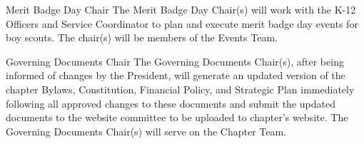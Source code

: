 \begin{enumsubsection}



\item{Merit Badge Day Chair} The Merit Badge Day Chair(s) will work with the K-12 Officers and Service Coordinator to plan and execute merit badge day events for boy scouts.  The chair(s) will be members of the Events Team. 

\item{Governing Documents Chair} The Governing Documents Chair(s), after being informed of changes by the President, will generate an updated version of the chapter Bylaws, Constitution, Financial Policy, and Strategic Plan immediately following all approved changes to these documents and submit the updated documents to the website committee to be uploaded to chapter’s website. The Governing Documents Chair(s) will serve on the Chapter Team. %


\end{enumsubsection}


